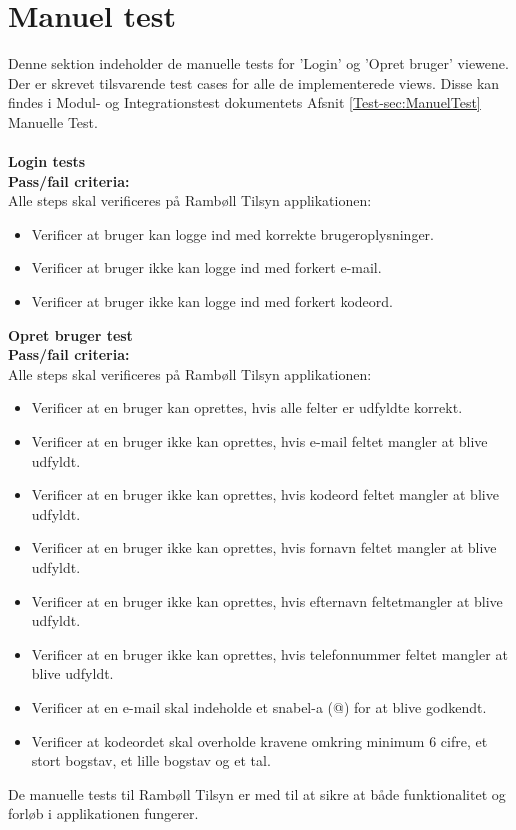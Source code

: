 \clearpage

\section{Manuel test}
Denne sektion indeholder de manuelle tests for 'Login' og 'Opret bruger' viewene. Der er skrevet tilsvarende test cases for alle de implementerede views. Disse kan findes i Modul- og Integrationstest dokumentets Afsnit \ref{Test-sec:ManuelTest} Manuelle Test. \\ \\
\textbf{Login tests} \\
\textbf{Pass/fail criteria:} \\
Alle steps skal verificeres på Rambøll Tilsyn applikationen:
\begin{itemize}[-]
	\item Verificer at bruger kan logge ind med korrekte brugeroplysninger.
	\item Verificer at bruger ikke kan logge ind med forkert e-mail.
	\item Verificer at bruger ikke kan logge ind med forkert kodeord. \\
\end{itemize}

\textbf{Opret bruger test} \\
\textbf{Pass/fail criteria:} \\
Alle steps skal verificeres på Rambøll Tilsyn applikationen:
\begin{itemize}[-]
	\item Verificer at en bruger kan oprettes, hvis alle felter er udfyldte korrekt.
	\item Verificer at en bruger ikke kan oprettes, hvis e-mail feltet mangler at blive udfyldt.
	\item Verificer at en bruger ikke kan oprettes, hvis kodeord feltet mangler at blive udfyldt.
	\item Verificer at en bruger ikke kan oprettes, hvis fornavn feltet mangler at blive udfyldt.
	\item Verificer at en bruger ikke kan oprettes, hvis efternavn feltetmangler at blive udfyldt.
	\item Verificer at en bruger ikke kan oprettes, hvis telefonnummer feltet mangler at blive udfyldt.
	\item Verificer at en e-mail skal indeholde et snabel-a (@) for at blive godkendt.
	\item Verificer at kodeordet skal overholde kravene omkring minimum 6 cifre, et stort bogstav, et lille bogstav og et tal.
\end{itemize}

De manuelle tests til Rambøll Tilsyn er med til at sikre at både funktionalitet og forløb i applikationen fungerer.